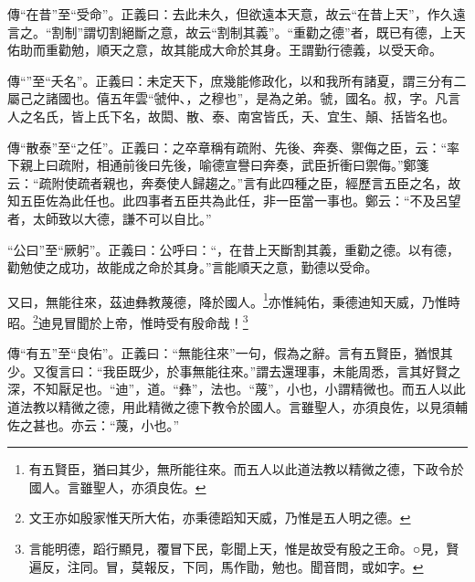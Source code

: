 {\noindent\zhuan{}\fzbyks 傳“在昔”至“受命”。正義曰：去此未久，但欲遠本天意，故云“在昔上天”，作久遠言之。“割制”謂切割絕斷之意，故云“割制其義”。“重勸之德”者，既已有德，上天佑助而重勸勉，順天之意，故其能成大命於其身。王謂勤行德義，以受天命。 \par}

{\noindent\zhuan{}\fzbyks 傳“”至“夭名”。正義曰：未定天下，庶幾能修政化，以和我所有諸夏，謂三分有二屬己之諸國也。僖五年雲“虢仲、，之穆也”，是為之弟。虢，國名。叔，字。凡言人之名氏，皆上氏下名，故閎、散、泰、南宮皆氏，夭、宜生、顛、括皆名也。 \par}

{\noindent\zhuan{}\fzbyks 傳“散泰”至“之任”。正義曰：之卒章稱有疏附、先後、奔奏、禦侮之臣，云：“率下親上曰疏附，相通前後曰先後，喻德宣譽曰奔奏，武臣折衝曰禦侮。”鄭箋云：“疏附使疏者親也，奔奏使人歸趨之。”言有此四種之臣，經歷言五臣之名，故知五臣佐為此任也。此四事者五臣共為此任，非一臣當一事也。鄭云：“不及呂望者，太師致以大德，謙不可以自比。” \par}

{\noindent\shu{}\fzkt “公曰”至“厥躬”。正義曰：公呼曰：“，在昔上天斷割其義，重勸之德。以有德，勸勉使之成功，故能成之命於其身。”言能順天之意，勤德以受命。 \par}

又曰，無能往來，茲迪彝教蔑德，降於國人。\footnote{有五賢臣，猶曰其少，無所能往來。而五人以此道法教以精微之德，下政令於國人。言雖聖人，亦須良佐。}亦惟純佑，秉德迪知天威，乃惟時昭。\footnote{文王亦如殷家惟天所大佑，亦秉德蹈知天威，乃惟是五人明之德。}迪見冒聞於上帝，惟時受有殷命哉！\footnote{言能明德，蹈行顯見，覆冒下民，彰聞上天，惟是故受有殷之王命。○見，賢遍反，注同。冒，莫報反，下同，馬作勖，勉也。聞音問，或如字。}


{\noindent\zhuan{}\fzbyks 傳“有五”至“良佑”。正義曰：“無能往來”一句，假為之辭。言有五賢臣，猶恨其少。又復言曰：“我臣既少，於事無能往來。”謂去還理事，未能周悉，言其好賢之深，不知厭足也。“迪”，道。“彝”，法也。“蔑”，小也，小謂精微也。而五人以此道法教以精微之德，用此精微之德下教令於國人。言雖聖人，亦須良佐，以見須輔佐之甚也。亦云：“蔑，小也。” \par}


